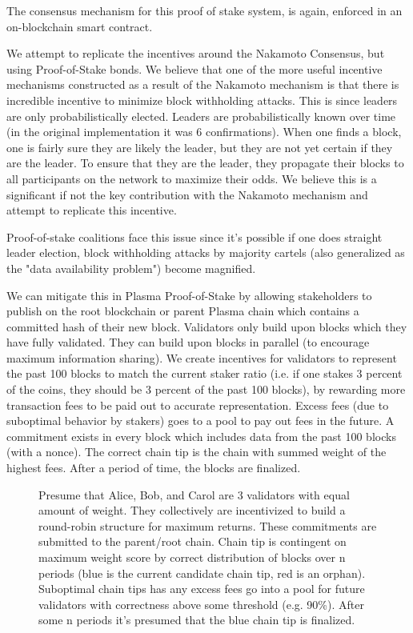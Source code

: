 \documentclass[letterpaper, 11pt]{article}
\begin{document}
The consensus mechanism for this proof of stake system, is again, enforced in an
on-blockchain smart contract.

We attempt to replicate the incentives around the Nakamoto Consensus, but using
Proof-of-Stake bonds. We believe that one of the more useful incentive
mechanisms constructed as a result of the Nakamoto mechanism is that there is
incredible incentive to minimize block withholding attacks. This is since
leaders are only probabilistically elected. Leaders are probabilistically known
over time (in the original implementation it was 6 confirmations). When one
finds a block, one is fairly sure they are likely the leader, but they are not
yet certain if they are the leader. To ensure that they are the leader, they
propagate their blocks to all participants on the network to maximize their
odds. We believe this is a significant if not the key contribution with the
Nakamoto mechanism and attempt to replicate this incentive.

Proof-of-stake coalitions face this issue since it's possible if one does
straight leader election, block withholding attacks by majority cartels (also
generalized as the "data availability problem") become magnified.

We can mitigate this in Plasma Proof-of-Stake by allowing stakeholders to
publish on the root blockchain or parent Plasma chain which contains a committed
hash of their new block. Validators only build upon blocks which they have fully
validated. They can build upon blocks in parallel (to encourage maximum
information sharing). We create incentives for validators to represent the
past 100 blocks to match the current staker ratio (i.e. if one stakes 3 percent
of the coins, they should be 3 percent of the past 100 blocks), by rewarding
more transaction fees to be paid out to accurate representation. Excess fees
(due to suboptimal behavior by stakers) goes to a pool to pay out fees in the
future. A commitment exists in every block which includes data from the past 100
blocks (with a nonce). The correct chain tip is the chain with summed weight of
the highest fees. After a period of time, the blocks are finalized.

\begin{figure}[H]
	\caption{
		Presume that Alice, Bob, and Carol are 3 validators with equal
		amount of weight. They collectively are incentivized to build a
		round-robin structure for maximum returns. These commitments are
		submitted to the parent/root chain. Chain tip is contingent on
		maximum weight score by correct distribution of blocks over n
		periods (blue is the current candidate chain tip, red is an
		orphan). Suboptimal chain tips has any excess fees go into a
		pool for future validators with correctness above some
		threshold (e.g. 90\%). After some n periods it's presumed that
		the blue chain tip is finalized.
		}
\end{figure}
\end{document}
